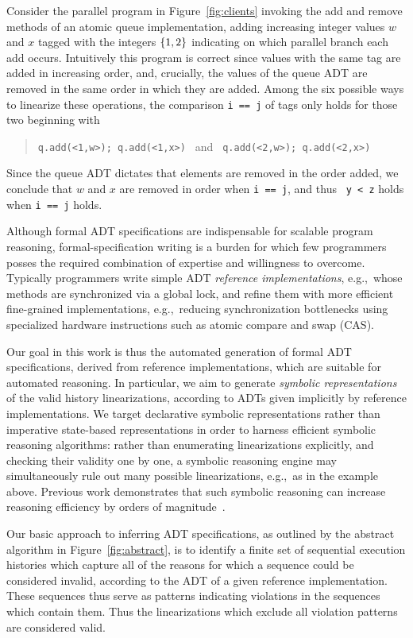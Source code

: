 Consider the parallel program in Figure~\ref{fig:clients} invoking the add and
remove methods of an atomic queue implementation, adding increasing integer
values $w$ and $x$ tagged with the integers ${\{{1,2}\}}$ indicating on which
parallel branch each add occurs. Intuitively this program is correct since
values with the same tag are added in increasing order, and, crucially, the
values of the queue ADT are removed in the same order in which they are added.
Among the six possible ways to linearize these operations, the comparison {\tt i ==
j} of tags only holds for those two beginning with
\begin{quote}
  \verb|q.add(<1,w>); q.add(<1,x>) | and \verb| q.add(<2,w>); q.add(<2,x>)|
\end{quote}
Since the queue ADT dictates that elements are removed in the order added, we
conclude that $w$ and $x$ are removed in order when {\tt i == j}, and thus {\tt
y < z} holds when {\tt i == j} holds.

Although formal ADT specifications are indispensable for scalable program
reasoning, formal-specification writing is a burden for which few programmers
posses the required combination of expertise and willingness to overcome.
Typically programmers write simple ADT \emph{reference implementations},
e.g.,~whose methods are synchronized via a global lock, and refine them with
more efficient fine-grained implementations, e.g.,~reducing synchronization
bottlenecks using specialized hardware instructions such as atomic compare and
swap (CAS).

Our goal in this work is thus the automated generation of formal ADT
specifications, derived from reference implementations, which are suitable for
automated reasoning. In particular, we aim to generate \emph{symbolic
representations} of the valid history linearizations, according to ADTs given
implicitly by reference implementations. We target declarative symbolic
representations rather than imperative state-based representations in order to
harness efficient symbolic reasoning algorithms: rather than enumerating
linearizations explicitly, and checking their validity one by one, a symbolic
reasoning engine may simultaneously rule out many possible linearizations,
e.g.,~as in the example above. Previous work demonstrates that such symbolic
reasoning can increase reasoning efficiency by orders of
magnitude~\cite{conf/pldi/EmmiEH15}.

Our basic approach to inferring ADT specifications, as outlined by the abstract
algorithm in Figure~\ref{fig:abstract}, is to identify a finite set of
sequential execution histories which capture all of the reasons for which a
sequence could be considered invalid, according to the ADT of a given reference
implementation. These sequences thus serve as patterns indicating violations in
the sequences which contain them. Thus the linearizations which exclude all
violation patterns are considered valid.

